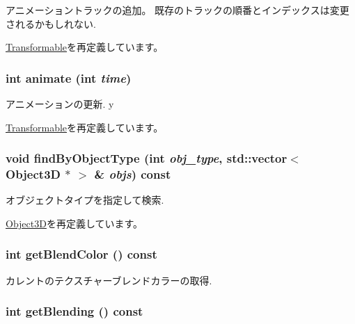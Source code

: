 アニメーショントラックの追加。 既存のトラックの順番とインデックスは変更されるかもしれない. 

\hyperlink{classm3g_1_1Transformable_415c0b110f95410ded9b85e5d99a496b}{Transformable}を再定義しています。\hypertarget{classm3g_1_1Texture2D_82cfeb67ca66b93e2ca7bda9a4f0e2aa}{
\subsubsection[{animate}]{\setlength{\rightskip}{0pt plus 5cm}int animate (int {\em time})}}
\label{classm3g_1_1Texture2D_82cfeb67ca66b93e2ca7bda9a4f0e2aa}


アニメーションの更新. y 

\hyperlink{classm3g_1_1Transformable_8aad1ceab4c2a03609c8a42324ce484d}{Transformable}を再定義しています。\hypertarget{classm3g_1_1Texture2D_4dadb21b568b0230fac106f15040138c}{
\subsubsection[{findByObjectType}]{\setlength{\rightskip}{0pt plus 5cm}void findByObjectType (int {\em obj\_\-type}, \/  std::vector$<$ {\bf Object3D} $\ast$ $>$ \& {\em objs}) const}}
\label{classm3g_1_1Texture2D_4dadb21b568b0230fac106f15040138c}


オブジェクトタイプを指定して検索. 

\hyperlink{classm3g_1_1Object3D_4dadb21b568b0230fac106f15040138c}{Object3D}を再定義しています。\hypertarget{classm3g_1_1Texture2D_b7dc7b7bf2934448281894f2c1ef3638}{
\subsubsection[{getBlendColor}]{\setlength{\rightskip}{0pt plus 5cm}int getBlendColor () const}}
\label{classm3g_1_1Texture2D_b7dc7b7bf2934448281894f2c1ef3638}


カレントのテクスチャーブレンドカラーの取得. \hypertarget{classm3g_1_1Texture2D_078954de3d786bd11dc98b06f237bbbb}{
\subsubsection[{getBlending}]{\setlength{\rightskip}{0pt plus 5cm}int getBlending () const}}
\label{classm3g_1_1Texture2D_078954de3d786bd11dc98b06f237bbbb}


